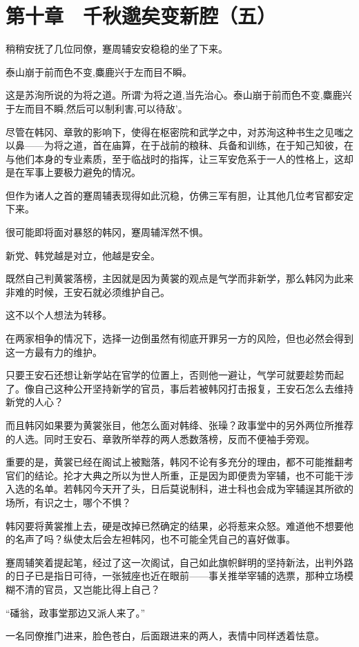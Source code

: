\section{第十章　千秋邈矣变新腔（五）}

稍稍安抚了几位同僚，蹇周辅安安稳稳的坐了下来。

泰山崩于前而色不变,麋鹿兴于左而目不瞬。

这是苏洵所说的为将之道。所谓‘为将之道,当先治心。泰山崩于前而色不变,麋鹿兴于左而目不瞬,然后可以制利害,可以待敌’。

尽管在韩冈、章敦的影响下，使得在枢密院和武学之中，对苏洵这种书生之见嗤之以鼻——为将之道，首在庙算，在于战前的粮秣、兵备和训练，在于知己知彼，在与他们本身的专业素质，至于临战时的指挥，让三军安危系于一人的性格上，这却是在军事上要极力避免的情况。

但作为诸人之首的蹇周辅表现得如此沉稳，仿佛三军有胆，让其他几位考官都安定下来。

很可能即将面对暴怒的韩冈，蹇周辅浑然不惧。

新党、韩党越是对立，他越是安全。

既然自己判黄裳落榜，主因就是因为黄裳的观点是气学而非新学，那么韩冈为此来非难的时候，王安石就必须维护自己。

这不以个人想法为转移。

在两家相争的情况下，选择一边倒虽然有彻底开罪另一方的风险，但也必然会得到这一方最有力的维护。

只要王安石还想让新学站在官学的位置上，否则他一避让，气学可就要趁势而起了。像自己这种公开坚持新学的官员，事后若被韩冈打击报复，王安石怎么去维持新党的人心？

而且韩冈如果要为黄裳张目，他怎么面对韩绛、张璪？政事堂中的另外两位所推荐的人选。同时王安石、章敦所举荐的两人悉数落榜，反而不便袖手旁观。

重要的是，黄裳已经在阁试上被黜落，韩冈不论有多充分的理由，都不可能推翻考官们的结论。抡才大典之所以为世人所重，正是因为即便贵为宰辅，也不可能干涉入选的名单。若韩冈今天开了头，日后莫说制科，进士科也会成为宰辅逞其所欲的场所，有识之士，哪个不惧？

韩冈要将黄裳推上去，硬是改掉已然确定的结果，必将惹来众怒。难道他不想要他的名声了吗？纵使太后会左袒韩冈，也不可能全凭自己的喜好做事。

蹇周辅笑着提起笔，经过了这一次阁试，自己如此旗帜鲜明的坚持新法，出判外路的日子已是指日可待，一张狨座也近在眼前——事关推举宰辅的选票，那种立场模糊不清的官员，又岂能比得上自己？

“磻翁，政事堂那边又派人来了。”

一名同僚推门进来，脸色苍白，后面跟进来的两人，表情中同样透着怯意。

